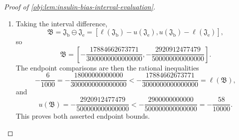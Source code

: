 \begin{proof}[Proof of \cref{obj:lem:insulin-bias-interval-evaluation}]
\begin{enumerate}
\item Taking the interval difference,
\[
\mathfrak B
=
\mathfrak J_{\mathrm b}\ominus\mathfrak J_{\mathrm e}
=
\left[
\ell(\mathfrak J_{\mathrm b})-u(\mathfrak J_{\mathrm e}),
u(\mathfrak J_{\mathrm b})-\ell(\mathfrak J_{\mathrm e})
\right],
\]
so
\[
\mathfrak B
=
\left[
-\frac{17884662673771}{3000000000000000},
-\frac{2920912477479}{500000000000000}
\right].
\]
The endpoint comparisons are then the rational inequalities
\[
-\frac{6}{1000}
=
-\frac{18000000000000}{3000000000000000}
<
-\frac{17884662673771}{3000000000000000}
=
\ell(\mathfrak B),
\]
and
\[
u(\mathfrak B)
=
-\frac{2920912477479}{500000000000000}
<
-\frac{2900000000000}{500000000000000}
=
-\frac{58}{10000}.
\]
This proves both asserted endpoint bounds.
\end{enumerate}
\end{proof}
